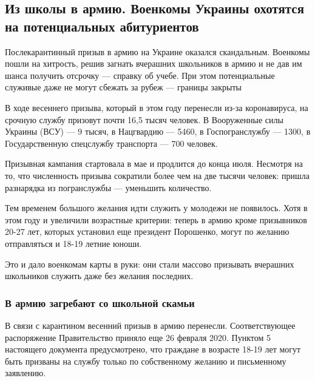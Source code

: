  
 
  
  
\subsection{Из школы в армию. Военкомы Украины охотятся на потенциальных абитуриентов }
\label{sec:14_07_2020.fb.lnr.1}


Послекарантинный призыв в армию на Украине оказался скандальным. Военкомы пошли
на хитрость, решив загнать вчерашних школьников в армию и не дав им шанса
получить отсрочку --- справку об учебе. При этом потенциальные служивые даже не
могут сбежать за рубеж --- границы закрыты 

В ходе весеннего призыва, который в этом году перенесли из-за коронавируса, на
срочную службу призовут почти 16,5 тысяч человек. В Вооруженные силы Украины
(ВСУ) --- 9 тысяч, в Нацгвардию --- 5460, в Госпогранслужбу --- 1300, в
Государственную спецслужбу транспорта --- 700 человек. 

Призывная кампания стартовала в мае и продлится до конца июля. Несмотря на то,
что численность призыва сократили более чем на две тысячи человек: пришла
разнарядка из погранслужбы --- уменьшить количество. 

Тем временем большого желания идти служить у молодежи не появилось. Хотя в этом
году и увеличили возрастные критерии: теперь в армию кроме призывников 20-27
лет, которых установил еще президент Порошенко, могут по желанию отправляться и
18-19 летние юноши. 

Это и дало военкомам карты в руки: они стали массово призывать вчерашних
школьников служить даже без желания последних. 

\subsubsection{В армию загребают со школьной скамьи}

В связи с карантином весенний призыв в армию перенесли. Соответствующее
распоряжение Правительство приняло еще 26 февраля 2020. Пунктом 5 настоящего
документа предусмотрено, что граждане в возрасте 18-19 лет могут быть призваны
на службу только по собственному желанию и письменному заявлению. 

